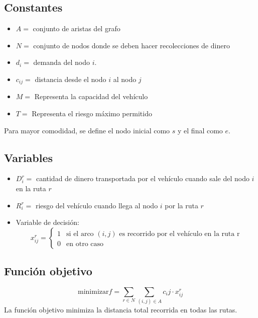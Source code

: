 \documentclass[letter, 10pt]{article}
\begin{document}
\subsection{Constantes}
\begin{itemize}
    \item $A =$ conjunto de aristas del grafo
    \item $N =$ conjunto de nodos donde se deben hacer recolecciones de dinero
    \item $d_i =$ demanda del nodo $i$. 
    \item $c_{ij} =$ distancia desde el nodo $i$ al nodo $j$
    \item $M =$ Representa la capacidad del vehículo
    \item $T =$ Representa el riesgo máximo permitido
\end{itemize}
Para mayor comodidad, se define el nodo inicial como $s$ y el final como $e$.

\subsection{Variables}
\begin{itemize}
    \item $D^r_i=$ cantidad de dinero transportada por el vehículo cuando sale del nodo $i$ en la ruta $r$
    \item $R_i^r=$ riesgo del vehículo cuando llega al nodo $i$ por la ruta $r$
    \item Variable de decisión:
    \begin{equation*}
        x^r_{ij}= 
        \begin{cases}
            1 & \text{si el arco $(i,j)$ es recorrido por el vehículo en la ruta r}\\
            0 & \text{en otro caso}
        \end{cases}
    \end{equation*}
\end{itemize}

\subsection{Función objetivo}
$$\text{minimizar} f = \sum_{r \in N}\sum_{(i,j) \in A} c_ij \cdot x^r_{ij}$$
La función objetivo minimiza la distancia total recorrida en todas las rutas.
\end{document}
